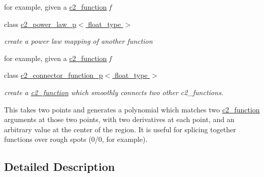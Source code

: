 \begin{DoxyCompactItemize}
\begin{DoxyCompactList}
for example, given a \hyperlink{classc2__function}{c2\+\_\+function} {\itshape f} \end{DoxyCompactList}\item 
class \hyperlink{classc2__power__law__p}{c2\+\_\+power\+\_\+law\+\_\+p$<$ float\+\_\+type $>$}
\begin{DoxyCompactList}\small\item\em create a power law mapping of another function

for example, given a \hyperlink{classc2__function}{c2\+\_\+function} {\itshape f} \end{DoxyCompactList}\item 
class \hyperlink{classc2__connector__function__p}{c2\+\_\+connector\+\_\+function\+\_\+p$<$ float\+\_\+type $>$}
\begin{DoxyCompactList}\small\item\em create a \hyperlink{classc2__function}{c2\+\_\+function} which smoothly connects two other c2\+\_\+functions.

This takes two points and generates a polynomial which matches two \hyperlink{classc2__function}{c2\+\_\+function} arguments at those two points, with two derivatives at each point, and an arbitrary value at the center of the region. It is useful for splicing together functions over rough spots (0/0, for example). \end{DoxyCompactList}\end{DoxyCompactItemize}


\subsection{Detailed Description}
